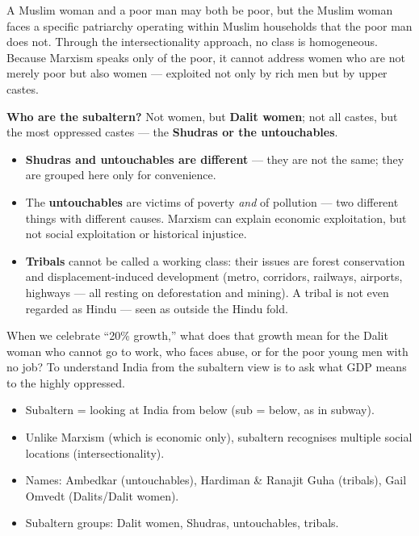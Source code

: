 A Muslim woman and a poor man may both be poor, but the Muslim woman faces a specific patriarchy operating within Muslim households that the poor man does not. Through the intersectionality approach, no class is homogeneous. Because Marxism speaks only of the poor, it cannot address women who are not merely poor but also women --- exploited not only by rich men but by upper castes.

\begin{KeyConcept}
\textbf{Who are the subaltern?} Not women, but \textbf{Dalit women}; not all castes, but the most oppressed castes --- the \textbf{Shudras or the untouchables}.
\end{KeyConcept}

\begin{itemize}
\item \textbf{Shudras and untouchables are different} --- they are not the same; they are grouped here only for convenience.
\item The \textbf{untouchables} are victims of poverty \emph{and} of pollution --- two different things with different causes. Marxism can explain economic exploitation, but not social exploitation or historical injustice.
\item \textbf{Tribals} cannot be called a working class: their issues are forest conservation and displacement-induced development (metro, corridors, railways, airports, highways --- all resting on deforestation and mining). A tribal is not even regarded as Hindu --- seen as outside the Hindu fold.
\end{itemize}

\begin{ExampleBox}
When we celebrate ``20\% growth,'' what does that growth mean for the Dalit woman who cannot go to work, who faces abuse, or for the poor young men with no job? To understand India from the subaltern view is to ask what GDP means to the highly oppressed.
\end{ExampleBox}

\begin{QuickRevision}
\begin{itemize}
\item Subaltern = looking at India from below (sub = below, as in subway).
\item Unlike Marxism (which is economic only), subaltern recognises multiple social locations (intersectionality).
\item Names: Ambedkar (untouchables), Hardiman \& Ranajit Guha (tribals), Gail Omvedt (Dalits/Dalit women).
\item Subaltern groups: Dalit women, Shudras, untouchables, tribals.
\end{itemize}
\end{QuickRevision}

